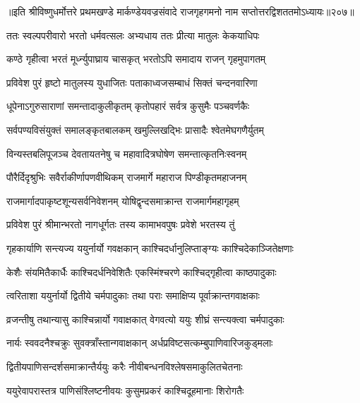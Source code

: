 ॥इति श्रीविष्णुधर्मोत्तरे प्रथमखण्डे मार्कण्डेयवज्रसंवादे राजगृहगमनो नाम सप्तोत्तरद्विशततमोऽध्यायः॥२०७॥



\twolineshloka
{ततः स्वल्पपरीवारो भरतो धर्मवत्सलः}
{अभ्यधाय ततः प्रीत्या मातुलः केकयाधिपः}%

\twolineshloka
{कण्ठे गृहीत्वा भरतं मूर्ध्न्युपाघ्राय चासकृत्}
{भरतोऽपि समादाय राजन् गृहमुपागतम्}%

\twolineshloka
{प्रविवेश पुरं हृष्टो मातुलस्य युधाजितः}
{पताकाध्वजसम्बाधं सिक्तं चन्दनवारिणा}%

\twolineshloka
{धूपेनाऽगुरुसाराणां समन्तादाकुलीकृतम्}
{कृतोपहारं सर्वत्र कुसुमैः पञ्चवर्णकैः}%

\twolineshloka
{सर्वपण्यविसंयुक्तं समालङ्कृतबालकम्}
{खमुल्लिखद्भिः प्रासादैः श्वेतमेघगणैर्युतम्}%

\twolineshloka
{विन्यस्तबलिपूजञ्च देवतायतनेषु च}
{महावादित्रघोषेण समन्तात्कृतनिःस्वनम्}%

\twolineshloka
{पौरैर्दिदृश्रुभिः सवैर्राकीर्णापणवीथिकम्}
{राजमार्गे महाराज पिण्डीकृतमहाजनम्}%

\twolineshloka
{राजमार्गादपाकृष्टशून्यसर्वनिवेशनम्}
{योषिद्वृन्दसमाक्रान्त राजमार्गमहागृहम्}%

\twolineshloka
{प्रविवेश पुरं श्रीमान्भरतो नागधूर्गतः}
{तस्य कामाभवपुषः प्रवेशे भरतस्य तुं}%

\twolineshloka
{गृहकार्याणि सन्त्यज्य ययुर्नार्यो गवक्षकान्}
{काश्चिदर्धानुलिप्ताङ्ग्यः काश्चिदेकाञ्जितेक्षणाः} %

\twolineshloka
{केशैः संयमितैकार्धैः काश्चिदर्धनिवेशितैः}
{एकस्मिंश्चरणे काश्चिद्गृहीत्वा काष्ठपादुकाः}%

\twolineshloka
{त्वरिताशा ययुर्नार्यो द्वितीये चर्मपादुकाः}
{तथा पराः समाक्षिप्य पूर्वाक्रान्तगवाक्षकाः}%

\twolineshloka
{व्रजन्तीषु तथान्यासु काश्चिन्नार्यो गवाक्षकात्}
{वेगवत्यो ययुः शीघ्रं सन्त्यक्त्वा चर्मपादुकाः}%

\twolineshloka
{नार्यः स्ववदनैश्चक्रुः सुवक्त्राँस्तान्गवाक्षकान्}
{अर्धप्रविष्टसत्कम्बुपाणिवारिजकुड्मलाः}%

\twolineshloka
{द्वितीयपाणिसन्दर्शसमाक्रान्तैर्ययुः करैः}
{नीवीबन्धनविश्लेषसमाकुलितचेतनाः}%

\twolineshloka
{ययुरेवापरास्तत्र पाणिसंश्लिष्टनीवयः}
{कुसुमप्रकरं काश्चिदूहमानाः शिरोगतैः}%

